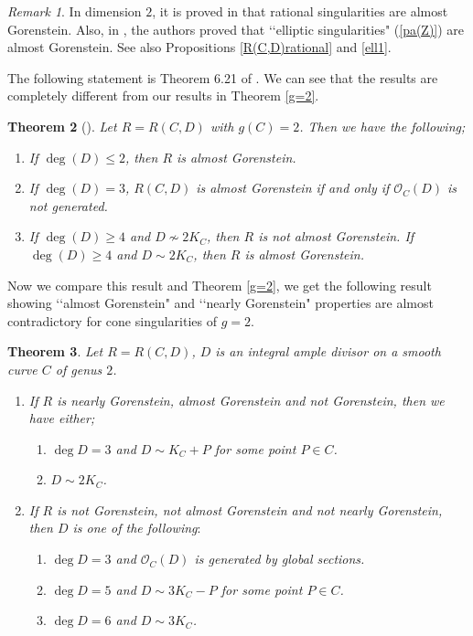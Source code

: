 \documentclass[12pt]{amsart}
\newtheorem{thm}{Theorem}[section]
\theoremstyle{definition}
\theoremstyle{remark}
\newtheorem{rem}[thm]{Remark}
\numberwithin{equation}{section}
\newcommand{\cO}{\mathcal O}
\renewcommand{\:}{\colon}
\begin{document}
\begin{rem} In dimension $2$, it is proved in \cite{GTT} that rational singularities are 
almost Gorenstein. Also, in \cite{OWYaG}, the authors proved that 
\lq\lq elliptic singularities"
(\ref{pa(Z)}) are almost Gorenstein.  
See also Propositions \ref{R(C,D)rational} and \ref{ell1}. 
\end{rem}



\par 
The following statement is Theorem 6.21 of \cite{OWYaG}. 
We can see that the results are 
completely different 
from our results in Theorem \ref{g=2}.


 
\begin{thm}[\textrm{\cite[Theorem 6.21]{OWYaG}}] 
Let $R=R(C,D)$ with $g(C)=2$. Then we have the following;
\begin{enumerate}  
\item If $\deg(D) \le 2$, then $R$ is almost Gorenstein.
\item If $\deg(D) = 3$, $R(C,D)$ is almost Gorenstein if and only if $\cO_C(D)$ is 
{\em not} generated.
\item If $\deg(D) \ge 4$ and $D \not\sim 2K_C$, then $R$ is {\em not} 
almost Gorenstein. 
If $\deg(D) \ge 4$ and $D\sim 2K_C$, then $R$ is almost Gorenstein. 
\end{enumerate}
\end{thm}

\par 
Now we compare this result and Theorem \ref{g=2}, 
we get the following result 
showing \lq\lq almost Gorenstein" and \lq\lq nearly Gorenstein" 
properties are
almost contradictory for cone singularities of $g=2$. 

\begin{thm} Let $R=R(C,D)$, $D$ is an  {\em integral} ample 
divisor on a smooth curve $C$ of genus $2$. 
\begin{enumerate}
\item[$(1)$] If $R$ is nearly Gorenstein, almost Gorenstein and not Gorenstein, then 
we have either;
\begin{enumerate} 
\item[\rm{(a)}]  $\deg D = 3$ and $D\sim K_C +P$ for some point $P\in C$.  
\item[\rm{(b)}]  $D\sim 2K_C$.  
\end{enumerate}
\item[$(2)$] 
If $R$ is not Gorenstein, not almost Gorenstein and not nearly Gorenstein, 
then $D$ is one of the following$:$
\begin{enumerate}
\item[\rm{(a)}]  $\deg D =3$ and $\cO_C(D)$ is generated by global sections.
\item[\rm{(b)}] $\deg D =5$ and $D \sim 3K_C -P$ for some point $P\in C$. 
\item[\rm{(c)}]  $\deg D=6$ and $D\sim 3K_C$. 
\end{enumerate}
\end{enumerate}
\end{thm} 
\end{document}
